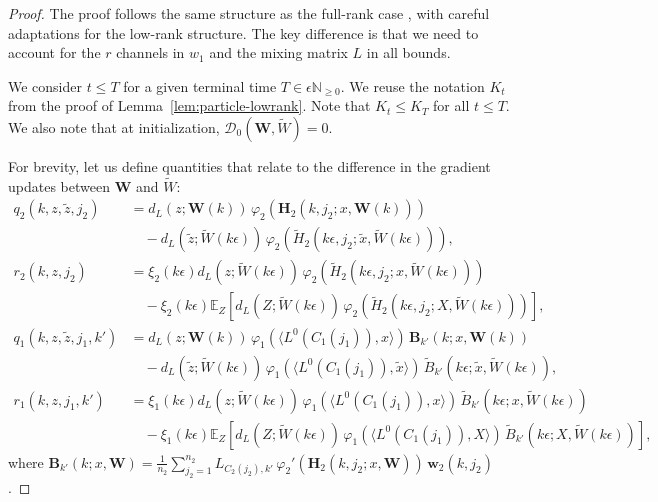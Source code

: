 \documentclass[nohyperref]{article}
\theoremstyle{plain}
\theoremstyle{definition}
\theoremstyle{remark}
\begin{document}
\begin{proof}
The proof follows the same structure as the full-rank case \cite{nguyen2020global}, with careful adaptations for the low-rank structure. The key difference is that we need to account for the $r$ channels in $w_1$ and the mixing matrix $L$ in all bounds.

We consider $t \le T$ for a given terminal time $T \in \epsilon\mathbb{N}_{\ge 0}$. We reuse the notation $K_t$ from the proof of Lemma~\ref{lem:particle-lowrank}. Note that $K_t \le K_T$ for all $t \le T$. We also note that at initialization, $\mathscr{D}_0(\mathbf{W}, \tilde{W}) = 0$.

For brevity, let us define quantities that relate to the difference in the gradient updates between $\mathbf{W}$ and $\tilde{W}$:
\begin{align*}
q_2(k, z, \tilde{z}, j_2) &= d_L(z; \mathbf{W}(k))\,\varphi_2(\mathbf{H}_2(k, j_2; x, \mathbf{W}(k)))\\
&\quad - d_L(\tilde{z}; \tilde{W}(k\epsilon))\,\varphi_2(\tilde{H}_2(k\epsilon, j_2; \tilde{x}, \tilde{W}(k\epsilon))),\\
r_2(k, z, j_2) &= \xi_2(k\epsilon)d_L(z; \tilde{W}(k\epsilon))\,\varphi_2(\tilde{H}_2(k\epsilon, j_2; x, \tilde{W}(k\epsilon)))\\
&\quad - \xi_2(k\epsilon)\mathbb{E}_Z[d_L(Z; \tilde{W}(k\epsilon))\,\varphi_2(\tilde{H}_2(k\epsilon, j_2; X, \tilde{W}(k\epsilon)))],\\
q_1(k, z, \tilde{z}, j_1, k') &= d_L(z; \mathbf{W}(k))\,\varphi_1(\langle L^0(C_1(j_1)), x\rangle)\,\mathbf{B}_{k'}(k; x, \mathbf{W}(k))\\
&\quad - d_L(\tilde{z}; \tilde{W}(k\epsilon))\,\varphi_1(\langle L^0(C_1(j_1)), \tilde{x}\rangle)\,\tilde{B}_{k'}(k\epsilon; \tilde{x}, \tilde{W}(k\epsilon)),\\
r_1(k, z, j_1, k') &= \xi_1(k\epsilon)d_L(z; \tilde{W}(k\epsilon))\,\varphi_1(\langle L^0(C_1(j_1)), x\rangle)\,\tilde{B}_{k'}(k\epsilon; x, \tilde{W}(k\epsilon))\\
&\quad - \xi_1(k\epsilon)\mathbb{E}_Z[d_L(Z; \tilde{W}(k\epsilon))\,\varphi_1(\langle L^0(C_1(j_1)), X\rangle)\,\tilde{B}_{k'}(k\epsilon; X, \tilde{W}(k\epsilon))],
\end{align*}
where $\mathbf{B}_{k'}(k; x, \mathbf{W}) = \frac{1}{n_2}\sum_{j_2=1}^{n_2} L_{C_2(j_2),k'}\,\varphi_2'(\mathbf{H}_2(k, j_2; x, \mathbf{W}))\,\mathbf{w}_2(k, j_2)$.


\end{proof}
\end{document}
